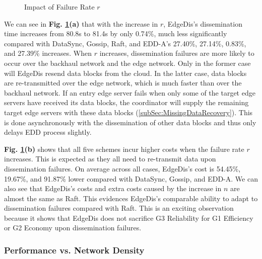 \documentclass[10pt,journal,compsoc]{IEEEtran}
\begin{document}
\begin{figure}
    \centering
    \vspace{-1em}
    \caption{Impact of Failure Rate $r$}\label{fig:InterruptionRatio}
\end{figure}

We can see in \textbf{Fig. \ref{fig:InterruptionRatio}(a)} that with the increase in $r$, EdgeDis's dissemination time increases from 80.8s to 81.4s by only 0.74\%, much less significantly compared with DataSync, Gossip, Raft, and EDD-A's 27.40\%, 27.14\%, 0.83\%, and 27.39\% increases. When $r$ increases, dissemination failures are more likely to occur over the backhaul network and the edge network. Only in the former case will EdgeDis resend data blocks from the cloud. In the latter case, data blocks are re-transmitted over the edge network, which is much faster than over the backhaul network. If an entry edge server fails when only some of the target edge servers have received its data blocks, the coordinator will supply the remaining target edge servers with these data blocks (\cref{subSec:MissingDataRecovery}). This is done asynchronously with the dissemination of other data blocks and thus only delays EDD process slightly.



\textbf{Fig. \ref{fig:InterruptionRatio}(b)} shows that all five schemes incur higher costs when the failure rate $r$ increases. This is expected as they all need to re-transmit data upon dissemination failures. On average across all cases, EdgeDis's cost is 54.45\%, 19.67\%, and 91.87\% lower compared with DataSync, Gossip, and EDD-A. We can also see that EdgeDis's costs and extra costs caused by the increase in $n$ are almost the same as Raft. This evidences EdgeDis's comparable ability to adapt to dissemination failures compared with Raft. This is an exciting observation because it shows that EdgeDis does not sacrifice G3 Reliability for G1 Efficiency or G2 Economy upon dissemination failures.


\subsubsection{Performance vs. Network Density}
\end{document}
